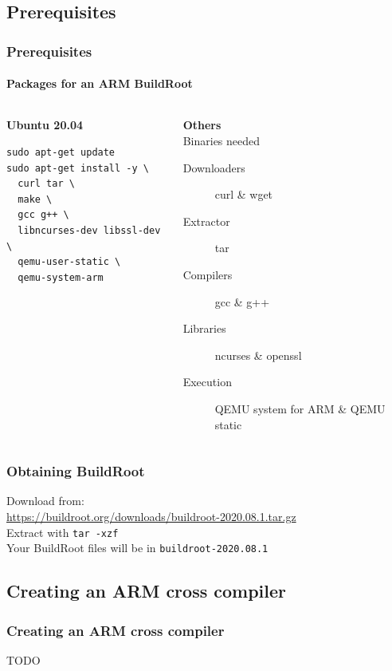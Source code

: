 \documentclass{beamer}
\newcommand{\buildrootLatestVersion}{2020.08.1}
\newcommand{\buildrootLatestVersionDownloadLink}{https://buildroot.org/downloads/buildroot-\buildrootLatestVersion.tar.gz}
\begin{document}
\subsection{Prerequisites}
\begin{frame}[fragile]
  \frametitle{Prerequisites}
  \framesubtitle{Packages for an ARM BuildRoot}
  \begin{columns}[t]
    \begin{column}{.5\textwidth}
      \textbf{Ubuntu 20.04}
      \begin{verbatim}
sudo apt-get update
sudo apt-get install -y \
  curl tar \
  make \
  gcc g++ \
  libncurses-dev libssl-dev \
  qemu-user-static \
  qemu-system-arm
      \end{verbatim}
    \end{column}
    \begin{column}{.5\textwidth}
      \textbf{Others} \\
      {\small Binaries needed}
      \begin{description}
        \item[Downloaders] curl \& wget
        \item[Extractor] tar
        \item[Compilers] gcc \& g++
        \item[Libraries] ncurses \& openssl
        \item[Execution] QEMU system for ARM \& QEMU static 
      \end{description}
    \end{column}
  \end{columns}
\end{frame}
\begin{frame}[fragile]
  \frametitle{Obtaining BuildRoot}
  \small
  Download from: \\
  \url{\buildrootLatestVersionDownloadLink} \\
  Extract with \texttt{tar -xzf} \\
  Your BuildRoot files will be in \texttt{buildroot-\buildrootLatestVersion}
\end{frame}
\subsection{Creating an ARM cross compiler}
\begin{frame}
  \frametitle{Creating an ARM cross compiler}
  \begin{center}
    TODO
  \end{center}
\end{frame}
\end{document}
